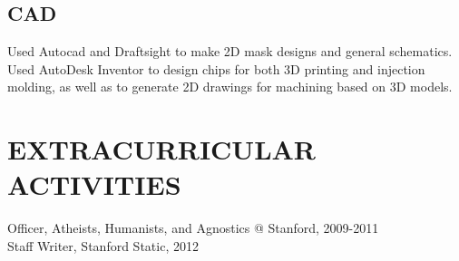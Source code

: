 \documentclass{res}
\begin{document}
\begin{resume}
 	\subsection{CAD}
 	Used Autocad and Draftsight to make 2D mask designs and general schematics.\\
 	Used AutoDesk Inventor to design chips for both 3D printing and injection molding,
 	as well as to generate 2D drawings for machining based on 3D models.



 \section{EXTRACURRICULAR ACTIVITIES}
     Officer, Atheists, Humanists, and Agnostics @ Stanford, 2009-2011\\
     Staff Writer, Stanford Static, 2012\\

\end{resume}
\end{document}

